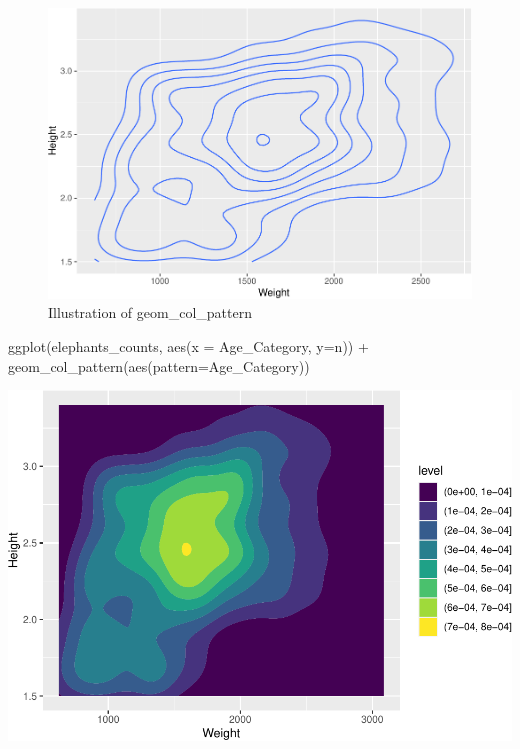 \documentclass[
]{book}
\newenvironment{Shaded}{\begin{snugshade}}{\end{snugshade}}
\newcommand{\AttributeTok}[1]{\textcolor[rgb]{0.77,0.63,0.00}{#1}}
\newcommand{\FunctionTok}[1]{\textcolor[rgb]{0.00,0.00,0.00}{#1}}
\newcommand{\NormalTok}[1]{#1}
\newcommand{\SpecialCharTok}[1]{\textcolor[rgb]{0.00,0.00,0.00}{#1}}
\begin{document}
\begin{figure}
\centering
\includegraphics{Data-Visualisation-geom-Encyclopedia_files/figure-latex/unnamed-chunk-32-1.pdf}
\caption{\label{fig:unnamed-chunk-32}Illustration of geom\_col\_pattern}
\end{figure}

\begin{Shaded}
\begin{Highlighting}[]
\FunctionTok{ggplot}\NormalTok{(elephants\_counts, }\FunctionTok{aes}\NormalTok{(}\AttributeTok{x =}\NormalTok{ Age\_Category, }\AttributeTok{y=}\NormalTok{n)) }\SpecialCharTok{+} 
  \FunctionTok{geom\_col\_pattern}\NormalTok{(}\FunctionTok{aes}\NormalTok{(}\AttributeTok{pattern=}\NormalTok{Age\_Category))}
\end{Highlighting}
\end{Shaded}

\includegraphics{Data-Visualisation-geom-Encyclopedia_files/figure-latex/unnamed-chunk-33-1.pdf}
\end{document}
